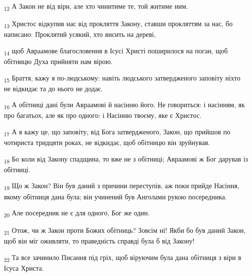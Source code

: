 \begin{tcolorbox}
\textsubscript{12} А Закон не від віри, але хто чинитиме те, той житиме ним.
\end{tcolorbox}
\begin{tcolorbox}
\textsubscript{13} Христос відкупив нас від прокляття Закону, ставши прокляттям за нас, бо написано: Проклятий усякий, хто висить на дереві,
\end{tcolorbox}
\begin{tcolorbox}
\textsubscript{14} щоб Авраамове благословення в Ісусі Христі поширилося на поган, щоб обітницю Духа прийняти нам вірою.
\end{tcolorbox}
\begin{tcolorbox}
\textsubscript{15} Браття, кажу я по-людському: навіть людського затвердженого заповіту ніхто не відкидає та до нього не додає.
\end{tcolorbox}
\begin{tcolorbox}
\textsubscript{16} А обітниці дані були Авраамові й насінню його. Не говориться: і насінням, як про багатьох, але як про одного: і Насінню твоєму, яке є Христос.
\end{tcolorbox}
\begin{tcolorbox}
\textsubscript{17} А я кажу це, що заповіту, від Бога затвердженого, Закон, що прийшов по чотириста тридцяти роках, не відкидає, щоб обітницю він зруйнував.
\end{tcolorbox}
\begin{tcolorbox}
\textsubscript{18} Бо коли від Закону спадщина, то вже не з обітниці; Авраамові ж Бог дарував із обітниці.
\end{tcolorbox}
\begin{tcolorbox}
\textsubscript{19} Що ж Закон? Він був даний з причини переступів, аж поки прийде Насіння, якому обітниця дана була; він учинений був Анголами рукою посередника.
\end{tcolorbox}
\begin{tcolorbox}
\textsubscript{20} Але посередник не є для одного, Бог же один.
\end{tcolorbox}
\begin{tcolorbox}
\textsubscript{21} Отож, чи ж Закон проти Божих обітниць? Зовсім ні! Якби бо був даний Закон, щоб він міг оживляти, то праведність справді була б від Закону!
\end{tcolorbox}
\begin{tcolorbox}
\textsubscript{22} Та все зачинило Писання під гріх, щоб віруючим була дана обітниця з віри в Ісуса Христа.
\end{tcolorbox}
